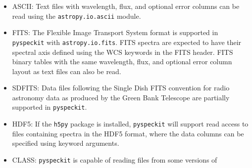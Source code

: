 \documentclass[twocolumn]{aastex63}
\newcommand{\pyspeckit}{\texttt{pyspeckit}\xspace}
\begin{document}
\begin{itemize}
    \item ASCII: Text files with wavelength, flux, and optional error
        columns can be read using the \texttt{astropy.io.ascii} module.
    \item FITS: The Flexible Image Transport System \citep[FITS;][]{Wells1981a,Greisen2006a,Pence2010a} format is
	supported in \pyspeckit with \texttt{astropy.io.fits}.  
    FITS spectra are expected to have their spectral axis defined using the WCS
    keywords in the FITS header.  FITS binary tables with the same
    wavelength, flux, and optional error column layout as text files
    can also be read.
    \item SDFITS: Data files following the Single
	Dish FITS \citep[SDFITS;][]{Garwood2000a} convention for radio astronomy data as
	produced by the Green Bank Telescope are partially supported in \pyspeckit.
    \item HDF5: 
        If the \texttt{h5py} package is installed, \pyspeckit will support read
        access to files containing spectra in the HDF5 format, where the data
        columns can be specified using keyword arguments.
    \item CLASS: \pyspeckit is capable of reading files from some versions of

\end{itemize}
\end{document}
